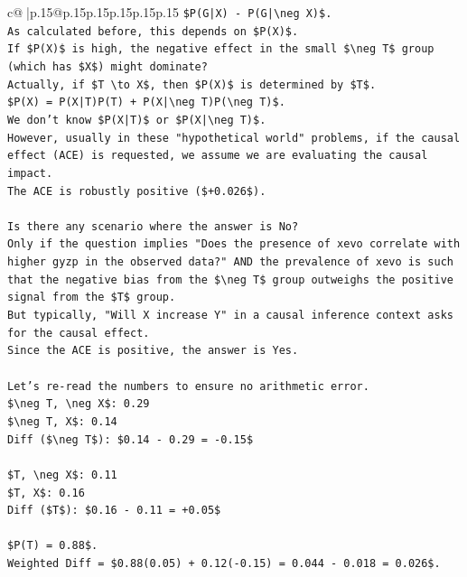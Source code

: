\documentclass{article}
\begin{document}
{\begin{supertabular}{c@{$\;$}|p{.15\linewidth}@{}p{.15\linewidth}p{.15\linewidth}p{.15\linewidth}p{.15\linewidth}p{.15\linewidth}}
{{{\texttt{\$P(G|X) {-} P(G|\textbackslash{}neg X)\$.} \\
\texttt{As calculated before, this depends on \$P(X)\$.} \\
\texttt{If \$P(X)\$ is high, the negative effect in the small \$\textbackslash{}neg T\$ group (which has \$X\$) might dominate?} \\
\texttt{Actually, if \$T \textbackslash{}to X\$, then \$P(X)\$ is determined by \$T\$.} \\
\texttt{\$P(X) = P(X|T)P(T) + P(X|\textbackslash{}neg T)P(\textbackslash{}neg T)\$.} \\
\texttt{We don't know \$P(X|T)\$ or \$P(X|\textbackslash{}neg T)\$.} \\
\texttt{However, usually in these "hypothetical world" problems, if the causal effect (ACE) is requested, we assume we are evaluating the causal impact.} \\
\texttt{The ACE is robustly positive (\$+0.026\$).} \\
\\ 
\texttt{Is there any scenario where the answer is No?} \\
\texttt{Only if the question implies "Does the presence of xevo correlate with higher gyzp in the observed data?" AND the prevalence of xevo is such that the negative bias from the \$\textbackslash{}neg T\$ group outweighs the positive signal from the \$T\$ group.} \\
\texttt{But typically, "Will X increase Y" in a causal inference context asks for the causal effect.} \\
\texttt{Since the ACE is positive, the answer is Yes.} \\
\\ 
\texttt{Let's re{-}read the numbers to ensure no arithmetic error.} \\
\texttt{\$\textbackslash{}neg T, \textbackslash{}neg X\$: 0.29} \\
\texttt{\$\textbackslash{}neg T, X\$: 0.14} \\
\texttt{Diff (\$\textbackslash{}neg T\$): \$0.14 {-} 0.29 = {-}0.15\$} \\
\\ 
\texttt{\$T, \textbackslash{}neg X\$: 0.11} \\
\texttt{\$T, X\$: 0.16} \\
\texttt{Diff (\$T\$): \$0.16 {-} 0.11 = +0.05\$} \\
\\ 
\texttt{\$P(T) = 0.88\$.} \\
\texttt{Weighted Diff = \$0.88(0.05) + 0.12({-}0.15) = 0.044 {-} 0.018 = 0.026\$.} \\
}}}
\end{supertabular}}
\end{document}
